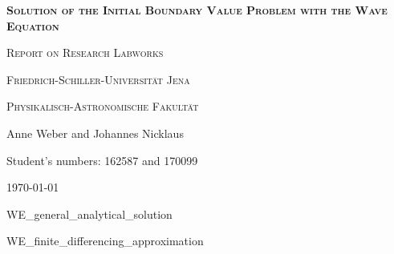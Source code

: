\documentclass[a4paper,headsepline,12pt,oneside]{scrartcl}
\begin{document}
\begin{titlepage}
	\centering

	{\scshape\Large \textbf{Solution of the Initial Boundary Value Problem with the Wave Equation} \par}
	\vspace{1cm}
	{\scshape\Large Report on Research Labworks \par}
	\vspace{1.5cm}
	{\huge\bfseries \par}
	\vspace{2cm}
	{\scshape\large Friedrich-Schiller-Universität Jena\par}
	{\scshape\large Physikalisch-Astronomische Fakultät\par}
	\vfill
	{\Large Anne Weber and Johannes Nicklaus\par}
	\vfill
	{Student's numbers: 162587 and 170099\par}

	\vfill

	{\large \today\par}
\end{titlepage}


\newpage
\setcounter{page}{0}
\tableofcontents
\clearpage
\setcounter{page}{1}

{WE_general_analytical_solution}

\clearpage

{WE_finite_differencing_approximation}


\clearpage

\clearpage

\clearpage
\end{document}
